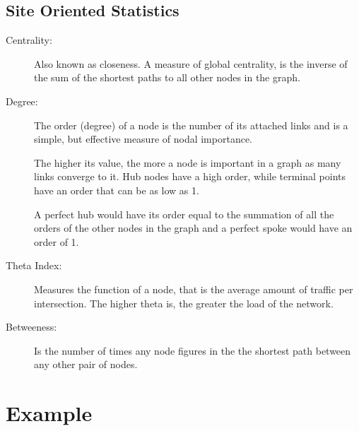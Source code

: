         \subsection{Site Oriented Statistics}
        \begin{description}
                \item[Centrality:]Also known as closeness. A measure of global centrality, is the 
                inverse of the sum of the shortest paths to all other nodes
                in the graph.
                \item[Degree:]The order (degree) of a node is the number of its attached links 
                and is a simple, but effective measure of nodal importance. 
                
                The higher its value, the more a node is important in a graph 
                as many links converge to it. Hub nodes have a high order, 
                while terminal points have an order that can be as low as 1. 
                
                A perfect hub would have its order equal to the summation of 
                all the orders of the other nodes in the graph and a perfect 
                spoke would have an order of 1.
                \item[Theta Index:]Measures the function of a node, that is the average
                amount of traffic per intersection. The higher theta is,
                the greater the load of the network.
                \item[Betweeness:]Is the number of times any node figures in the the shortest path
                between any other pair of nodes.
        \end{description}
       

\section{Example}